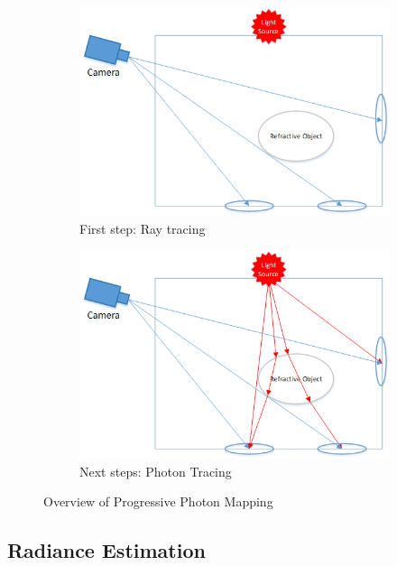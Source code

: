 \documentclass[main.tex]{subfiles}
\begin{document}
\begin{figure}
  \centering
  \begin{subfigure}{.5\textwidth}
    \centering
    \includegraphics[width=.95\linewidth]{visio/ppm_step1}
    \caption{First step: Ray tracing \label{fig:ppm_step1}}
  \end{subfigure}%
  \begin{subfigure}{.5\textwidth}
    \centering
    \includegraphics[width=.95\linewidth]{visio/ppm_step2}
    \caption{Next steps: Photon Tracing \label{fig:ppm_step2}}
  \end{subfigure}
  \caption{Overview of Progressive Photon Mapping \label{fig:ppm_overview}}
\end{figure}


\subsection{Radiance Estimation}
\end{document}
